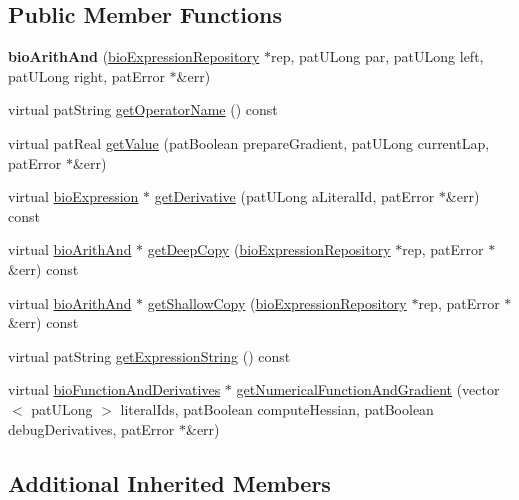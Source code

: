 \subsection*{Public Member Functions}
\begin{DoxyCompactItemize}
\item 
\mbox{\label{classbio_arith_and_a95f11b2bc685a1bf8d4b56217cdf2386}} 
{\bfseries bio\+Arith\+And} (\hyperlink{classbio_expression_repository}{bio\+Expression\+Repository} $\ast$rep, pat\+U\+Long par, pat\+U\+Long left, pat\+U\+Long right, pat\+Error $\ast$\&err)
\item 
virtual pat\+String \hyperlink{classbio_arith_and_accefac4c7d08a3698bd3691e19641bfb}{get\+Operator\+Name} () const
\item 
virtual pat\+Real \hyperlink{classbio_arith_and_a3e89f3ee81dd4703fd77e5b2da1e45ad}{get\+Value} (pat\+Boolean prepare\+Gradient, pat\+U\+Long current\+Lap, pat\+Error $\ast$\&err)
\item 
virtual \hyperlink{classbio_expression}{bio\+Expression} $\ast$ \hyperlink{classbio_arith_and_a78f633a87efd5a6cbf2130032ec7100c}{get\+Derivative} (pat\+U\+Long a\+Literal\+Id, pat\+Error $\ast$\&err) const
\item 
virtual \hyperlink{classbio_arith_and}{bio\+Arith\+And} $\ast$ \hyperlink{classbio_arith_and_aa60d3a4e8d9b4684e584991a2b1effe2}{get\+Deep\+Copy} (\hyperlink{classbio_expression_repository}{bio\+Expression\+Repository} $\ast$rep, pat\+Error $\ast$\&err) const
\item 
virtual \hyperlink{classbio_arith_and}{bio\+Arith\+And} $\ast$ \hyperlink{classbio_arith_and_a3dfc8f4f9247158b3ff4c3d8e61b95ad}{get\+Shallow\+Copy} (\hyperlink{classbio_expression_repository}{bio\+Expression\+Repository} $\ast$rep, pat\+Error $\ast$\&err) const
\item 
virtual pat\+String \hyperlink{classbio_arith_and_a9b21342d9f2f1bc59bbab1596b60ed48}{get\+Expression\+String} () const
\item 
virtual \hyperlink{classbio_function_and_derivatives}{bio\+Function\+And\+Derivatives} $\ast$ \hyperlink{classbio_arith_and_af6745a5c2aca1539519d14c9e1ce5f5e}{get\+Numerical\+Function\+And\+Gradient} (vector$<$ pat\+U\+Long $>$ literal\+Ids, pat\+Boolean compute\+Hessian, pat\+Boolean debug\+Derivatives, pat\+Error $\ast$\&err)
\end{DoxyCompactItemize}
\subsection*{Additional Inherited Members}


